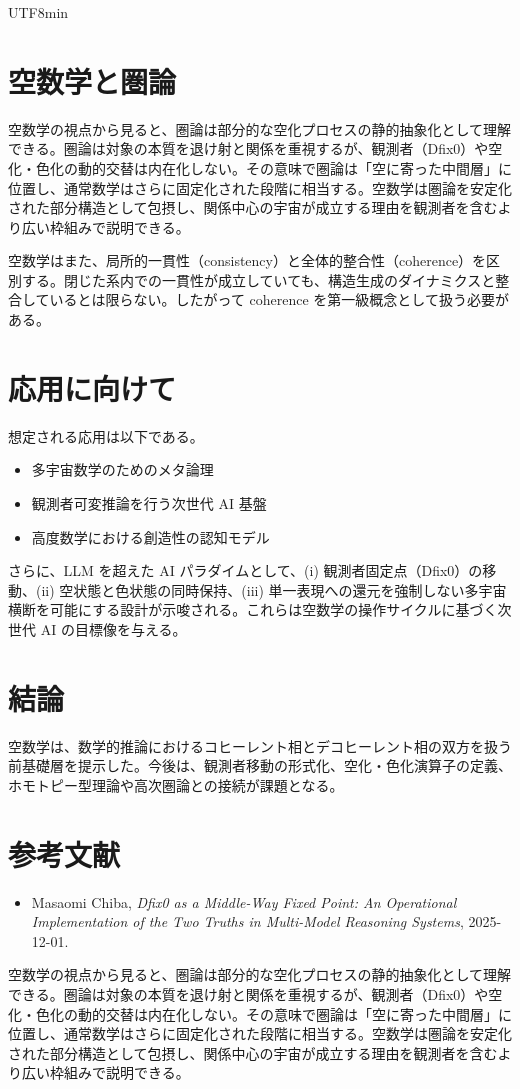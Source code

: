 \documentclass[11pt]{article}
\begin{document}
\begin{CJK}{UTF8}{min}
\section{空数学と圏論}
空数学の視点から見ると、圏論は部分的な空化プロセスの静的抽象化として理解できる。圏論は対象の本質を退け射と関係を重視するが、観測者（Dfix0）や空化・色化の動的交替は内在化しない。その意味で圏論は「空に寄った中間層」に位置し、通常数学はさらに固定化された段階に相当する。空数学は圏論を安定化された部分構造として包摂し、関係中心の宇宙が成立する理由を観測者を含むより広い枠組みで説明できる。

空数学はまた、局所的一貫性（consistency）と全体的整合性（coherence）を区別する。閉じた系内での一貫性が成立していても、構造生成のダイナミクスと整合しているとは限らない。したがって coherence を第一級概念として扱う必要がある。

\section{応用に向けて}
想定される応用は以下である。

\begin{itemize}
    \item 多宇宙数学のためのメタ論理
    \item 観測者可変推論を行う次世代 AI 基盤
    \item 高度数学における創造性の認知モデル
\end{itemize}

さらに、LLM を超えた AI パラダイムとして、(i) 観測者固定点（Dfix0）の移動、(ii) 空状態と色状態の同時保持、(iii) 単一表現への還元を強制しない多宇宙横断を可能にする設計が示唆される。これらは空数学の操作サイクルに基づく次世代 AI の目標像を与える。

\section{結論}
空数学は、数学的推論におけるコヒーレント相とデコヒーレント相の双方を扱う前基礎層を提示した。今後は、観測者移動の形式化、空化・色化演算子の定義、ホモトピー型理論や高次圏論との接続が課題となる。

\section*{参考文献}
\begin{itemize}
    \item Masaomi Chiba, \emph{Dfix0 as a Middle-Way Fixed Point: An Operational Implementation of the Two Truths in Multi-Model Reasoning Systems}, 2025-12-01.
\end{itemize}
空数学の視点から見ると、圏論は部分的な空化プロセスの静的抽象化として理解できる。圏論は対象の本質を退け射と関係を重視するが、観測者（Dfix0）や空化・色化の動的交替は内在化しない。その意味で圏論は「空に寄った中間層」に位置し、通常数学はさらに固定化された段階に相当する。空数学は圏論を安定化された部分構造として包摂し、関係中心の宇宙が成立する理由を観測者を含むより広い枠組みで説明できる。


\end{CJK}
\end{document}
